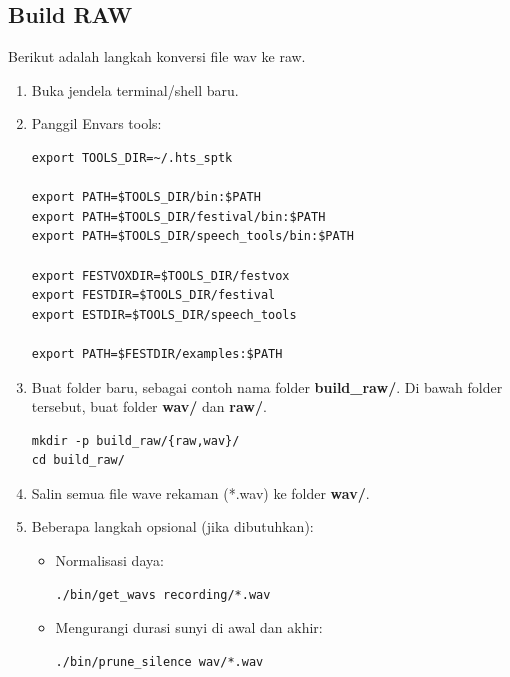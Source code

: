 \documentclass[12pt,]{article}
\begin{document}
	\newpage
	\subsection{Build RAW}
	
	Berikut adalah langkah konversi file wav ke raw.
	
	\begin{enumerate}
		\item Buka jendela terminal/shell baru.
		
		\item Panggil Envars tools:
		\begin{verbatim}
export TOOLS_DIR=~/.hts_sptk

export PATH=$TOOLS_DIR/bin:$PATH
export PATH=$TOOLS_DIR/festival/bin:$PATH
export PATH=$TOOLS_DIR/speech_tools/bin:$PATH

export FESTVOXDIR=$TOOLS_DIR/festvox
export FESTDIR=$TOOLS_DIR/festival
export ESTDIR=$TOOLS_DIR/speech_tools

export PATH=$FESTDIR/examples:$PATH
		\end{verbatim}
		
		\item Buat folder baru, sebagai contoh nama folder \textbf{build\_raw/}.
		Di bawah folder tersebut, buat folder \textbf{wav/} dan \textbf{raw/}.
		\begin{verbatim}
mkdir -p build_raw/{raw,wav}/
cd build_raw/
		\end{verbatim}
		
		\item Salin semua file wave rekaman (*.wav) ke folder \textbf{wav/}.
		
		\item Beberapa langkah opsional (jika dibutuhkan):
		
		\begin{itemize}
			\item Normalisasi daya:
			\begin{verbatim}
./bin/get_wavs recording/*.wav
			\end{verbatim}
			
			\item Mengurangi durasi sunyi di awal dan akhir:
			\begin{verbatim}
./bin/prune_silence wav/*.wav
			\end{verbatim}
			

\end{itemize}
\end{enumerate}
\end{document}
